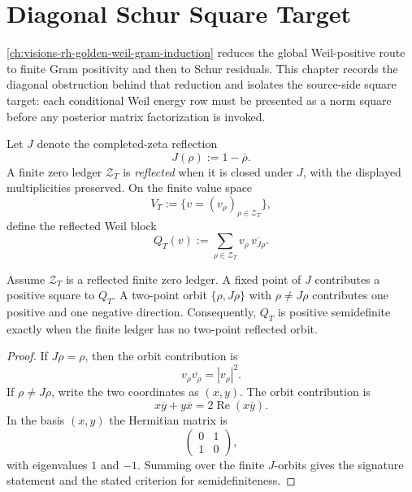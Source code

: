 \chapter{Diagonal Schur Square Target}
\label{ch:visions-rh-diagonal-schur-square-target}

\autoref{ch:visions-rh-golden-weil-gram-induction} reduces the global
Weil-positive route to finite Gram positivity and then to Schur
residuals.  This chapter records the diagonal obstruction behind that
reduction and isolates the source-side square target: each conditional
Weil energy row must be presented as a norm square before any posterior
matrix factorization is invoked.

\begin{definition}
\label{def:rh-finite-reflected-zero-ledger}
Let $J$ denote the completed-zeta reflection
$$
J(\rho):=1-\overline{\rho}.
$$
A finite zero ledger $\mathcal Z_T$ is \emph{reflected} when it is
closed under $J$, with the displayed multiplicities preserved.  On the
finite value space
$$
V_T:=\{v=(v_\rho)_{\rho\in\mathcal Z_T}\},
$$
define the reflected Weil block
$$
Q_T(v)
:=
\sum_{\rho\in\mathcal Z_T}
v_\rho\,\overline{v_{J\rho}}.
$$
\end{definition}

\begin{theorem}
\label{thm:rh-finite-reflected-weil-signature}
Assume $\mathcal Z_T$ is a reflected finite zero ledger.  A fixed point
of $J$ contributes a positive square to $Q_T$.  A two-point orbit
$\{\rho,J\rho\}$ with $\rho\ne J\rho$ contributes one positive and one
negative direction.  Consequently, $Q_T$ is positive semidefinite
exactly when the finite ledger has no two-point reflected orbit.
\end{theorem}

\begin{proof}
If $J\rho=\rho$, then the orbit contribution is
$$
v_\rho\overline{v_\rho}=|v_\rho|^2.
$$
If $\rho\ne J\rho$, write the two coordinates as $(x,y)$.  The orbit
contribution is
$$
x\overline{y}+y\overline{x}
=
2\operatorname{Re}(x\overline{y}).
$$
In the basis $(x,y)$ the Hermitian matrix is
$$
\begin{pmatrix}
0 & 1\\
1 & 0
\end{pmatrix},
$$
with eigenvalues $1$ and $-1$.  Summing over the finite $J$-orbits gives
the signature statement and the stated criterion for semidefiniteness.
\end{proof}

